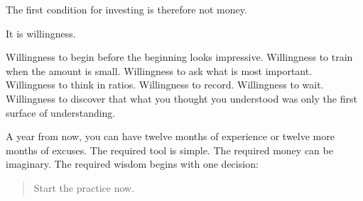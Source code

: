 The first condition for investing is therefore not money.

It is willingness.

Willingness to begin before the beginning looks impressive. Willingness to train when the amount is small. Willingness to ask what is most important. Willingness to think in ratios. Willingness to record. Willingness to wait. Willingness to discover that what you thought you understood was only the first surface of understanding.

A year from now, you can have twelve months of experience or twelve more months of excuses. The required tool is simple. The required money can be imaginary. The required wisdom begins with one decision:

\begin{quote}
Start the practice now.
\end{quote}
